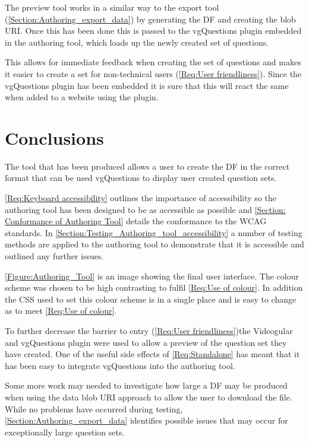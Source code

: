 The preview tool works in a similar way to the export tool (\autoref{Section:Authoring_export_data}) by generating the \gls{DF} and creating the \gls{blob} URI. Once this has been done this is passed to the \gls{vgQuestions} plugin embedded in the authoring tool, which loads up the newly created set of questions.

This allows for immediate feedback when creating the set of questions and makes it easier to create a set for non-technical users (\cref{Req:User friendliness}). Since the \gls{vgQuestions} plugin has been embedded it is sure that this will react the same when added to a website using the plugin.

\section{Conclusions}
\label{Section:Authoring_Conclusion}

The tool that has been produced allows a user to create the \gls{DF} in the correct format that can be used \gls{vgQuestions} to display user created question sets.

\cref{Req:Keyboard accessibility} outlines the importance of accessibility so the authoring tool has been designed to be as accessible as possible and \autoref{Section: Conformance of Authoring Tool} details the conformance to the \gls{WCAG} standards. In \autoref{Section:Testing_Authoring_tool_accessibility} a number of testing methods are applied to the authoring tool to demonstrate that it is accessible and outlined any further issues.

\autoref{Figure:Authoring_Tool} is an image showing the final user interface. The colour scheme was chosen to be high contrasting to fulfil \cref{Req:Use of colour}. In addition the \gls{CSS} used to set this colour scheme is in a single place and is easy to change as to meet \cref{Req:Use of colour}.

To further decrease the barrier to entry (\cref{Req:User friendliness})the \gls{Videogular} and \gls{vgQuestions} plugin were used to allow a preview of the question set they have created. One of the useful side effects of \cref{Req:Standalone} has meant that it has been easy to integrate \gls{vgQuestions} into the authoring tool.

Some more work may needed to investigate how large a \gls{DF} may be produced when using the data \gls{blob} URI approach to allow the user to download the file. While no problems have occurred during testing, \autoref{Section:Authoring_export_data} identifies possible issues that may occur for exceptionally large question sets.

